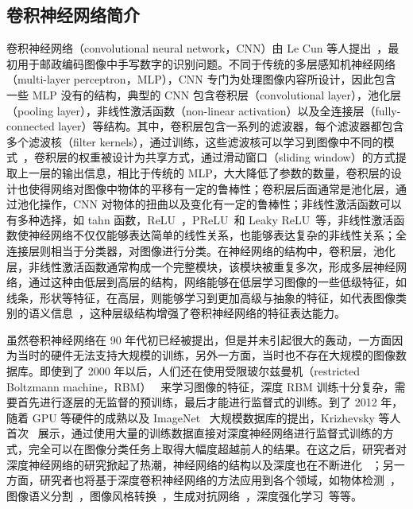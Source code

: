 \subsection{卷积神经网络简介}
卷积神经网络（convolutional neural network，CNN）由 Le Cun 等人提出~\cite{Lecun1990HandwrittenZC,LeCun1998GradientbasedLA}，最初用于邮政编码图像中手写数字的识别问题。不同于传统的多层感知机神经网络（multi-layer perceptron，MLP），CNN 专门为处理图像内容所设计，因此包含一些 MLP 没有的结构，典型的 CNN 包含卷积层（convolutional layer），池化层（pooling layer），非线性激活函数（non-linear activation）以及全连接层（fully-connected layer）等结构。其中，卷积层包含一系列的滤波器，每个滤波器都包含多个滤波核（filter kernels），通过训练，这些滤波核可以学习到图像中不同的模式~\cite{Zeiler2014VisualizingAU,Krizhevsky2012ImageNetCW}，卷积层的权重被设计为共享方式，通过滑动窗口（sliding window）的方式提取上一层的输出信息，相比于传统的 MLP，大大降低了参数的数量，卷积层的设计也使得网络对图像中物体的平移有一定的鲁棒性；卷积层后面通常是池化层，通过池化操作，CNN 对物体的扭曲以及变化有一定的鲁棒性；非线性激活函数可以有多种选择，如 tahn 函数，ReLU~\cite{Glorot2011DeepSR}，PReLU~\cite{He2015DelvingDI}和 Leaky ReLU~\cite{maas2013rectifier}等，非线性激活函数使神经网络不仅仅能够表达简单的线性关系，也能够表达复杂的非线性关系；全连接层则相当于分类器，对图像进行分类。在神经网络的结构中，卷积层，池化层，非线性激活函数通常构成一个完整模块，该模块被重复多次，形成多层神经网络，通过这种由低层到高层的结构，网络能够在低层学习图像的一些低级特征，如线条，形状等特征，在高层，则能够学习到更加高级与抽象的特征，如代表图像类别的语义信息~\cite{Krizhevsky2012ImageNetCW}，这种层级结构增强了卷积神经网络的特征表达能力。

虽然卷积神经网络在 90 年代初已经被提出，但是并未引起很大的轰动，一方面因为当时的硬件无法支持大规模的训练，另外一方面，当时也不存在大规模的图像数据库。即使到了 2000 年以后，人们还在使用受限玻尔兹曼机（restricted Boltzmann machine，RBM）~\cite{Salakhutdinov2009DeepBM,Salakhutdinov2012AnEL} 来学习图像的特征，深度 RBM 训练十分复杂，需要首先进行逐层的无监督的预训练，最后才能进行监督式的训练。到了 2012 年，随着 GPU 等硬件的成熟以及 ImageNet~\cite{Russakovsky2015ImageNetLS} 大规模数据库的提出，Krizhevsky 等人首次~\cite{Krizhevsky2012ImageNetCW} 展示，通过使用大量的训练数据直接对深度神经网络进行监督式训练的方式，完全可以在图像分类任务上取得大幅度超越前人的结果。在这之后，研究者对深度神经网络的研究掀起了热潮，神经网络的结构以及深度也在不断进化~
\cite{Zeiler2014VisualizingAU,Simonyan2014VeryDC,Szegedy2015GoingDW,He2016DeepRL,Huang2017DenselyCC}；另一方面，研究者也将基于深度卷积神经网络的方法应用到各个领域，如物体检测~\cite{Liu2016SSDSS,Redmon2016YouOL,Lin2017FocalLF,Ren2017FasterRT}，图像语义分割~\cite{Shelhamer2017FullyCN,Chen2018DeepLabSI,Noh2015LearningDN}，图像风格转换~\cite{Gatys2016ImageST,Johnson2016PerceptualLF}，生成对抗网络~\cite{Goodfellow2014GenerativeAN,Mirza2014ConditionalGA}，深度强化学习~\cite{Mnih2015HumanlevelCT,Silver2016MasteringTG}等等。


